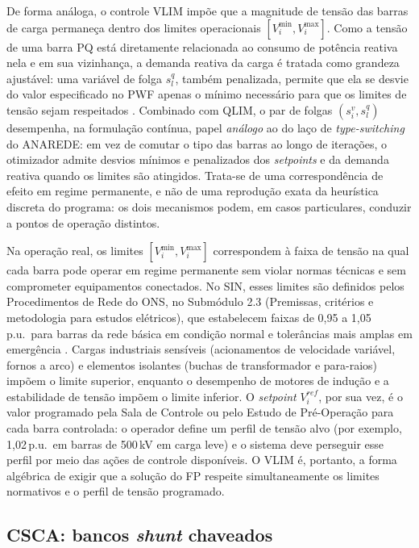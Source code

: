 De forma análoga, o controle VLIM impõe que a magnitude de tensão das barras de carga permaneça dentro dos limites operacionais $[V^{\min}_i, V^{\max}_i]$. Como a tensão de uma barra PQ está diretamente relacionada ao consumo de potência reativa nela e em sua vizinhança, a demanda reativa da carga é tratada como grandeza ajustável: uma variável de folga $s^q_l$, também penalizada, permite que ela se desvie do valor especificado no PWF apenas o mínimo necessário para que os limites de tensão sejam respeitados \cite{chavarry2024}. Combinado com QLIM, o par de folgas $(s^v_i, s^q_l)$ desempenha, na formulação contínua, papel \emph{análogo} ao do laço de \textit{type-switching} do ANAREDE: em vez de comutar o tipo das barras ao longo de iterações, o otimizador admite desvios mínimos e penalizados dos \textit{setpoints} e da demanda reativa quando os limites são atingidos. Trata-se de uma correspondência de efeito em regime permanente, e não de uma reprodução exata da heurística discreta do programa: os dois mecanismos podem, em casos particulares, conduzir a pontos de operação distintos.

Na operação real, os limites $[V^{\min}_i, V^{\max}_i]$ correspondem à faixa de tensão na qual cada barra pode operar em regime permanente sem violar normas técnicas e sem comprometer equipamentos conectados. No SIN, esses limites são definidos pelos Procedimentos de Rede do ONS, no Submódulo 2.3 (Premissas, critérios e metodologia para estudos elétricos), que estabelecem faixas de 0,95 a 1,05\,p.u.\ para barras da rede básica em condição normal e tolerâncias mais amplas em emergência \cite{ons2026sm23cr}. Cargas industriais sensíveis (acionamentos de velocidade variável, fornos a arco) e elementos isolantes (buchas de transformador e para-raios) impõem o limite superior, enquanto o desempenho de motores de indução e a estabilidade de tensão impõem o limite inferior. O \textit{setpoint} $V^{ref}_i$, por sua vez, é o valor programado pela Sala de Controle ou pelo Estudo de Pré-Operação para cada barra controlada: o operador define um perfil de tensão alvo (por exemplo, 1,02\,p.u.\ em barras de 500\,kV em carga leve) e o sistema deve perseguir esse perfil por meio das ações de controle disponíveis. O VLIM é, portanto, a forma algébrica de exigir que a solução do FP respeite simultaneamente os limites normativos e o perfil de tensão programado.

\subsection{CSCA: bancos \textit{shunt} chaveados}
\label{subsec:csca}

